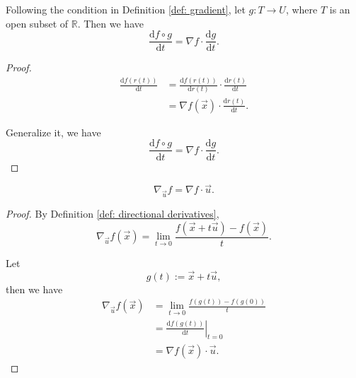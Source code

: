 \begin{lemma}
	Following the condition in Definition \ref{def: gradient}, let $g: T \to U$, where $T$ is an open subset of $\mathbb R$. Then we have
	$$
	\frac{\mathrm d f \circ g}{\mathrm d t} = \nabla f \cdot \frac{\mathrm d g}{\mathrm dt}.
	$$

	\begin{proof}
		$$
		\begin{aligned}
			\frac{\mathrm d f(r(t))}{\mathrm dt} &= \frac{\mathrm d f(r(t))}{\mathrm dr(t)} \cdot \frac{\mathrm dr(t)}{\mathrm d t} \\
			&= \nabla f(\vec x) \cdot \frac{\mathrm dr(t)}{\mathrm dt}.
		\end{aligned}
		$$
		
		Generalize it, we have
		$$
		\frac{\mathrm d f \circ g}{\mathrm d t} = \nabla f \cdot \frac{\mathrm d g}{\mathrm dt}.
		$$
	\end{proof}
\end{lemma}



\begin{lemma}
	$$
	\nabla_{\vec u} f = \nabla f \cdot \vec u.
	$$
	
	\begin{proof}
		By Definition \ref{def: directional derivatives},
		$$
		\nabla_{\vec u} f(\vec x) = \lim_{t \to 0} \frac{f(\vec x + t\vec u) - f(\vec x)}{t}.
		$$
		
		Let
		$$
		g(t) := \vec x + t\vec u,
		$$
		then we have
		$$
		\begin{aligned}
			\nabla_{\vec u} f(\vec x) &= \lim_{t \to 0} \frac{f(g(t)) - f(g(0))}{t} \\
			&= \left. \frac{\mathrm d f(g(t))}{\mathrm dt} \right|_{t = 0} \\
			&= \nabla f(\vec x) \cdot \vec u.
		\end{aligned}
		$$
	\end{proof}
\end{lemma}

















